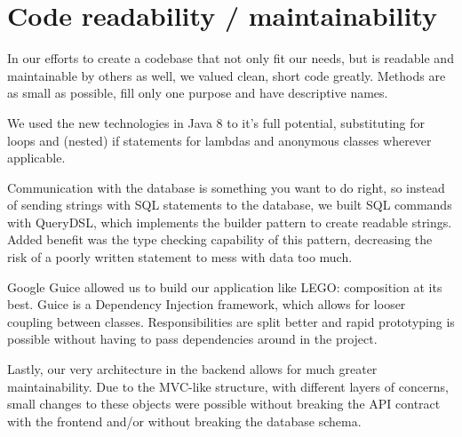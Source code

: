 \section{Code readability / maintainability}
In our efforts to create a codebase that not only fit our needs, but is readable and maintainable by others as well, we valued clean, short code greatly. Methods are as small as possible, fill only one purpose and have descriptive names. 

We used the new technologies in Java 8 to it's full potential, substituting for loops and (nested) if statements for lambdas and anonymous classes wherever applicable.

Communication with the database is something you want to do right, so instead of sending strings with SQL statements to the database, we built SQL commands with QueryDSL, which implements the builder pattern to create readable strings. Added benefit was the type checking capability of this pattern, decreasing the risk of a poorly written statement to mess with data too much.

Google Guice allowed us to build our application like LEGO: composition at its best. Guice is a Dependency Injection framework, which allows for looser coupling between classes. Responsibilities are split better and rapid prototyping is possible without having to pass dependencies around in the project.

Lastly, our very architecture in the backend allows for much greater maintainability. Due to the MVC-like structure, with different layers of concerns, small changes to these objects were possible without breaking the API contract with the frontend and/or without breaking the database schema. 

